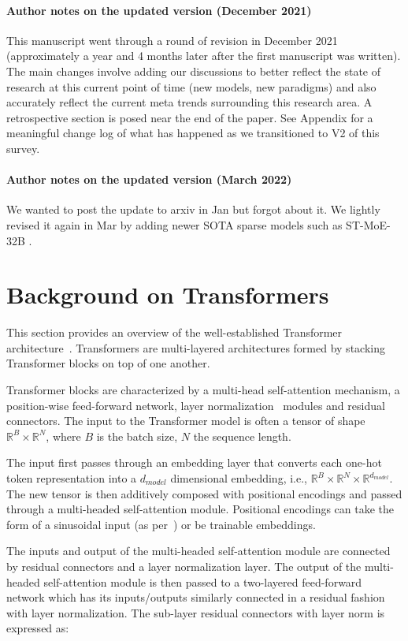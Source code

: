 \paragraph{Author notes on the updated version (December 2021)} This manuscript went through a round of revision in December 2021 (approximately a year and 4 months later after the first manuscript was written). The main changes involve adding our discussions to better reflect the state of research at this current point of time (new models, new paradigms) and also accurately reflect the current meta trends surrounding this research area. A retrospective section is posed near the end of the paper. See Appendix for a meaningful change log of what has happened as we transitioned to V2 of this survey.

\paragraph{Author notes on the updated version (March 2022)} We wanted to post the update to arxiv in Jan but forgot about it. We lightly revised it again in Mar by adding newer SOTA sparse models such as ST-MoE-32B \citep{zoph2022designing}.

\section{Background on Transformers} This section provides an overview of the well-established Transformer architecture~\citep{vaswani2017attention}. Transformers are multi-layered architectures formed by stacking Transformer blocks on top of one another. 

Transformer blocks are characterized by a multi-head self-attention mechanism, a position-wise feed-forward network, layer normalization~\citep{ba2016layer} modules and residual connectors. The input to the Transformer model is often a tensor of shape $\mathbb{R}^B \times \mathbb{R}^N$, where $B$ is the batch size, $N$ the sequence length.

The input first passes through an embedding layer that converts each one-hot token representation into a $d_{model}$ dimensional embedding, i.e., $\mathbb{R}^B \times \mathbb{R}^N \times \mathbb{R}^{d_{model}}$. The new tensor is then additively composed with positional encodings and passed through a multi-headed self-attention module. Positional encodings can take the form of a sinusoidal input (as per~\citep{vaswani2017attention}) or be trainable embeddings.

The inputs and output of the multi-headed self-attention module are connected by residual connectors and a layer normalization layer. The output of the multi-headed self-attention module is then passed to a two-layered feed-forward network which has its inputs/outputs similarly connected in a residual fashion with layer normalization. The sub-layer residual connectors with layer norm is expressed as:

